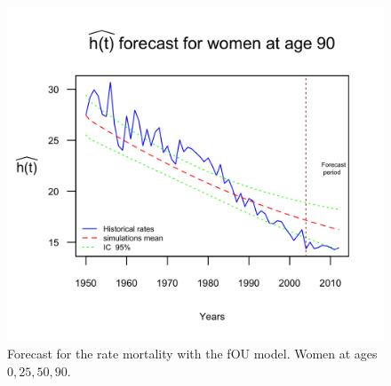 \documentclass[smallextended]{svjour3}
\begin{document}
\begin{figure}[H]
    \includegraphics{PlotWomenForecast90.png}
    \caption{Forecast for the rate mortality with the fOU model. Women at ages
    $0,25,50,90$.}
    \label{graph-graph-forecast_women_FOU1}
\end{figure}\vspace*{0.1cm}
\end{document}
